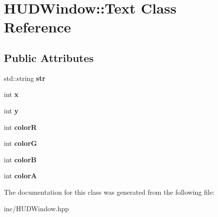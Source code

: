 \hypertarget{class_h_u_d_window_1_1_text}{\section{H\+U\+D\+Window\+:\+:Text Class Reference}
\label{class_h_u_d_window_1_1_text}
}
\subsection*{Public Attributes}
\begin{DoxyCompactItemize}
\item 
\hypertarget{class_h_u_d_window_1_1_text_a33f10a1d33234b7820a1adbd89c213da}{std\+::string {\bfseries str}}\label{class_h_u_d_window_1_1_text_a33f10a1d33234b7820a1adbd89c213da}

\item 
\hypertarget{class_h_u_d_window_1_1_text_a8fa18534f2539eb429a61e81d4757aa0}{int {\bfseries x}}\label{class_h_u_d_window_1_1_text_a8fa18534f2539eb429a61e81d4757aa0}

\item 
\hypertarget{class_h_u_d_window_1_1_text_a9a442ada676af7400c5e2fb029e21631}{int {\bfseries y}}\label{class_h_u_d_window_1_1_text_a9a442ada676af7400c5e2fb029e21631}

\item 
\hypertarget{class_h_u_d_window_1_1_text_ac27e9b9d747436e29a58e2c1a1588c9e}{int {\bfseries color\+R}}\label{class_h_u_d_window_1_1_text_ac27e9b9d747436e29a58e2c1a1588c9e}

\item 
\hypertarget{class_h_u_d_window_1_1_text_a291c3396885b04078e2679f77b1178f4}{int {\bfseries color\+G}}\label{class_h_u_d_window_1_1_text_a291c3396885b04078e2679f77b1178f4}

\item 
\hypertarget{class_h_u_d_window_1_1_text_ac9c3cdca8295cf2934df815e82ca7e4d}{int {\bfseries color\+B}}\label{class_h_u_d_window_1_1_text_ac9c3cdca8295cf2934df815e82ca7e4d}

\item 
\hypertarget{class_h_u_d_window_1_1_text_a21f5f0d45795fb8f64fc9140aa912478}{int {\bfseries color\+A}}\label{class_h_u_d_window_1_1_text_a21f5f0d45795fb8f64fc9140aa912478}

\end{DoxyCompactItemize}


The documentation for this class was generated from the following file\+:\begin{DoxyCompactItemize}
\item 
inc/H\+U\+D\+Window.\+hpp\end{DoxyCompactItemize}
